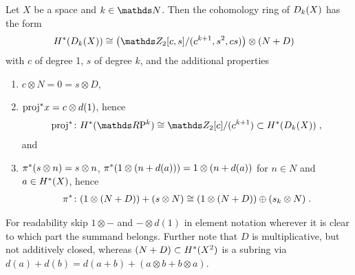 \begin{Thm}\label{thm:twistedprod:cohomstructure}
  Let $X$ be a space and $k\in\Nat$.
  Then the cohomology ring of $D_{k}({X})$ has the form
  \begin{align*}
    \H^*(\Twistedprod{k}{X})
    &\cong
      \left(
      \Zmod2[c,s]/(c^{k+1},s^2,cs)
      \right)
      \otimes (N+D)
  \end{align*}
  with $c$ of degree 1, $s$ of degree $k$, and the additional
  properties
  \begin{enumerate}
  \item $c\otimes N=0=s\otimes D$, 
  \item ${\mathrm{proj}}^* x = c\otimes d(1)$,
    hence
    \begin{gather*}
      \pb\proj\colon\H^*(\RP k)\cong
      \Zmod2[c]/(c^{k+1})\subset\H^*(\Twistedprod k X)
      \;,
    \end{gather*}
    and
  \item\label{item:twistedprodcohom:pi}
    ${\pi}^* (s\otimes n) = s\otimes n$,
    ${\pi}^* (1\otimes (n+d(a))) = 1\otimes (n+d(a))$
    for $n\in N$ and $a\in H^*(X)$,
    hence
    \begin{gather*}
      {\pi}^*\colon (1\otimes(N+D)) + (s\otimes N)
      \cong (1\otimes(N+D))\oplus (s_k\otimes N)
      \;.
    \end{gather*}
  \end{enumerate}
  For readability skip $1\otimes-$ and $-\otimes d(1)$ in element
  notation wherever it is clear to which part the summand
  belongs.
  Further note that $D$ is multiplicative, but not additively closed,
  whereas $(N+D)\subset H^*(X^2)$ is a subring via
  $d(a)+d(b) = d(a+b)+(a\otimes b+ b\otimes a)$.
\end{Thm}

